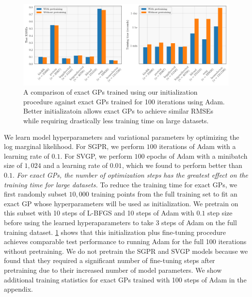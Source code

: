 \begin{figure}[ht!]
  \centering
  \includegraphics[width=\linewidth]{figures/initialization-rmse-timings.pdf}
  \caption{
	A comparison of exact GPs trained using our initialization procedure against exact GPs trained for 100 iterations using Adam.
	Better initializatoin allows exact GPs to achieve similar RMSEs while requiring drastically less training time on large datasets.
  }
  \label{fig:initialization-test}
\end{figure}
We learn model hyperparameters and variational parameters
by optimizing the log marginal likelihood.
For SGPR, we perform $100$ iterations of Adam with a learning rate of $0.1$.
For SVGP, we perform $100$ epochs of Adam with a minibatch size of $1,\!024$ and a learning rate of $0.01$, which
we found to perform better than $0.1$.
\textit{For exact GPs, the number of optimization steps has the greatest
effect on the training time for large datasets.} To reduce the training time for
exact GPs, we first randomly
subset $10,\!000$ training points from the full training set to fit an exact GP whose hyperparameters will be used as initialization. We pretrain on this subset with 10 steps
of L-BFGS \citep{liu1989lbfgs} and 10 steps of Adam \citep{kingma2014adam} with $0.1$ step size before using the learned hyperaparameters to take 3 steps of Adam on the full training dataset. \cref{fig:initialization-test} shows
that this initialization plus fine-tuning procedure achieves comparable test
performance to running Adam for the full 100 iterations without pretraining.
We do not pretrain the SGPR and SVGP models because we found that they
required a significant number of fine-tuning steps after pretraining due to
their increased number of model parameters. We show additional training
statistics for exact GPs trained with 100 steps of Adam in the appendix.

